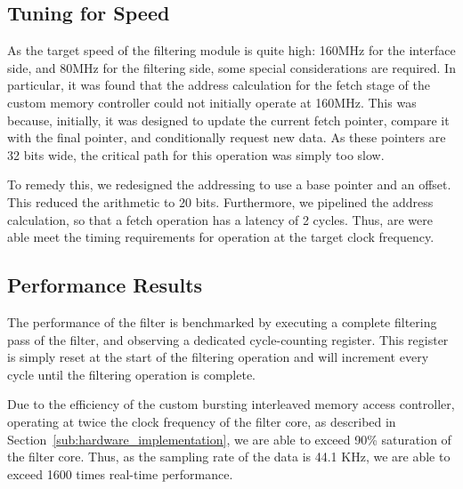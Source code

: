 \documentclass[]{article}
\begin{document}


\subsection{Tuning for Speed} %
\label{sub:tuning_for_speed}

As the target speed of the filtering module is quite high: 160MHz for the interface side, and 80MHz for the filtering side, some special considerations are required.
In particular, it was found that the address calculation for the fetch stage of the custom memory controller could not initially operate at 160MHz.
This was because, initially, it was designed to update the current fetch pointer, compare it with the final pointer, and conditionally request new data. As these pointers are 32 bits wide, the critical path for this operation was simply too slow.

To remedy this, we redesigned the addressing to use a base pointer and an offset. This reduced the arithmetic to 20 bits. Furthermore, we pipelined the address calculation, so that a fetch operation has a latency of 2 cycles.
Thus, are were able meet the timing requirements for operation at the target clock frequency.



\subsection{Performance Results} %
\label{sub:performance_results}

The performance of the filter is benchmarked by executing a complete filtering pass of the filter, and observing a dedicated cycle-counting register. This register is simply reset at the start of the filtering operation and will increment every cycle until the filtering operation is complete.

Due to the efficiency of the custom bursting interleaved memory access controller, operating at twice the clock frequency of the filter core, as described in Section~\ref{sub:hardware_implementation}, we are able to exceed 90\% saturation of the filter core.
Thus, as the sampling rate of the data is 44.1 KHz, we are able to exceed 1600 times real-time performance.
\end{document}
